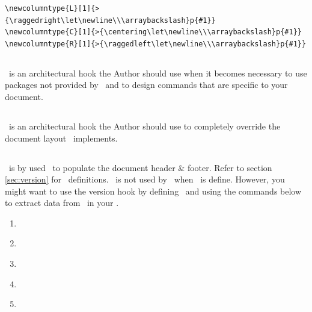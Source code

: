 \documentclass[12pt]{tlc-article}
\begin{document}
\begin{lstlisting}[basicstyle=\tiny]
\newcolumntype{L}[1]{>{\raggedright\let\newline\\\arraybackslash}p{#1}}
\newcolumntype{C}[1]{>{\centering\let\newline\\\arraybackslash}p{#1}}
\newcolumntype{R}[1]{>{\raggedleft\let\newline\\\arraybackslash}p{#1}}
\end{lstlisting}


\subsection{\tlcAL}
\tlcAL\ is an architectural hook the Author should use when it becomes necessary
to use packages not provided by \tlcA\, and to design commands that are specific
to your document.


\subsection{\tlcHF}
\tlcHF\ is an architectural hook the Author should use to completely override
the document layout \tlcA\ implements.


\clearpage
\subsection{\tlcVE}
\tlcVE\ is by used \tlcA\ to populate the document header \& footer.  Refer to
section \ref{sec:version} for \tlcVE\ definitions. \tlcVE\ is not
used by \tlcA\ when \tlcHF\ is define.  However, you might want to use the
version hook by defining \tlcVE\ and using the commands below to extract data
from \tlcVE\ in your \tlcHF.
\begin{enumerate}
  \item \tlcVC\
  \item \tlcDC\
  \item \tlcSC\
  \item \tlcIC\
  \item \tlcPC\
\end{enumerate}
\end{document}
